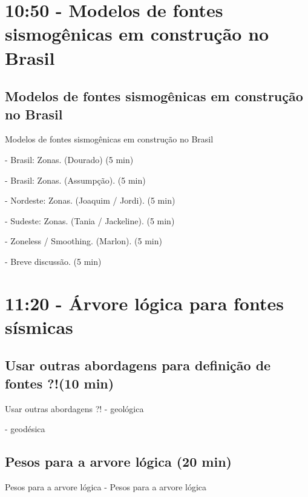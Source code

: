 \documentclass[ucs,8pt]{beamer}
\begin{document}
\section{10:50 - Modelos de fontes sismogênicas em construção no Brasil}
	\subsection{Modelos de fontes sismogênicas em construção no Brasil}
	
	\begin{frame}{Modelos de fontes sismogênicas em construção no Brasil}
		
		- Brasil: Zonas. (Dourado) (5 min)
	
		- Brasil: Zonas. (Assumpção). (5 min)
		
		- Nordeste: Zonas. (Joaquim / Jordi). (5 min)
		
		- Sudeste: Zonas. (Tania / Jackeline). (5 min)
		
		- Zoneless / Smoothing. (Marlon). (5 min)
		
		- Breve discussão. (5 min)
	
	\end{frame}



\section{11:20 - Árvore lógica para fontes sísmicas}
	\subsection{Usar outras abordagens para definição de fontes ?!(10 min)}
	\begin{frame}{Usar outras abordagens ?!}
		- geológica
		
		- geodésica
	\end{frame}

	\subsection{Pesos para a arvore lógica (20 min)}
	\begin{frame}{Pesos para a arvore lógica}
		- Pesos para a arvore lógica
	\end{frame}
\end{document}
